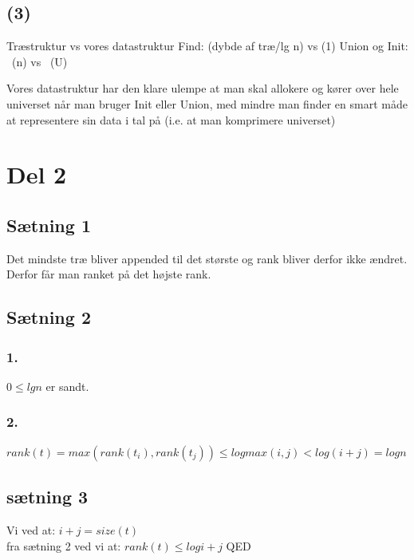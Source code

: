 \documentclass[12pt, a4paper, hidelinks]{article}
\begin{document}
\subsection{(3)}
Træstruktur vs vores datastruktur
Find: \Theta (dybde af træ/lg n) vs \Theta (1)
Union og Init: ~\Theta(n) vs ~\Theta(U)

Vores datastruktur har den klare ulempe at man skal allokere og kører over hele universet når man bruger Init eller Union, med mindre man finder en smart måde at representere sin data i tal på (i.e. at man komprimere universet)

\section{ Del 2 }
\subsection {Sætning 1}
Det mindste træ bliver appended til det største og rank bliver derfor ikke ændret. Derfor får man ranket på det højste rank.
\subsection{Sætning 2}
\subsubsection {1.}
$0 \leq lg n$ er sandt.
\subsubsection{2.}
$rank(t) = max(rank(t_i), rank(t_j)) \leq log max(i, j) < log (i + j) = log n$

\subsection {sætning 3}
Vi ved at: $i + j = size(t)$ \\
fra sætning 2 ved vi at: $rank(t) \leq log i+j$
QED



\end{document}
